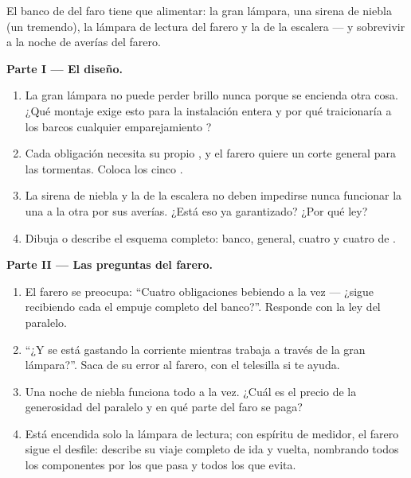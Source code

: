 \begin{problem}\label{pb:g7:circuits-series-parallel:1}
El banco de  del faro tiene que alimentar: la gran lámpara,
una sirena de niebla (un  tremendo), la lámpara de lectura del
farero y la  de la escalera --- y sobrevivir a la noche de
averías del farero.

\medskip\noindent\textbf{Parte I --- El diseño.}
\begin{enumerate}
  \item La gran lámpara no puede perder brillo nunca porque se
        encienda otra cosa. ¿Qué montaje exige esto para la
        instalación entera y por qué traicionaría a los barcos
        cualquier emparejamiento ?
  \item Cada obligación necesita su propio , y el farero
        quiere un corte general para las tormentas. Coloca los cinco
        .
  \item La sirena de niebla y la  de la escalera no deben
        impedirse nunca funcionar la una a la otra por sus averías.
        ¿Está eso ya garantizado? ¿Por qué ley?
  \item Dibuja o describe el esquema completo: banco,
         general, cuatro  y cuatro
         de .
\end{enumerate}

\medskip\noindent\textbf{Parte II --- Las preguntas del farero.}
\begin{enumerate}[resume]
  \item El farero se preocupa: ``Cuatro obligaciones bebiendo a la
        vez --- ¿sigue recibiendo cada  el empuje completo del
        banco?''. Responde con la ley del paralelo.
  \item ``¿Y se está gastando la corriente mientras trabaja a través
        de la gran lámpara?''. Saca de su error al farero, con el
        telesilla si te ayuda.
  \item Una noche de niebla funciona todo a la vez. ¿Cuál es el
        precio de la generosidad del paralelo y en qué parte del faro
        se paga?
  \item Está encendida solo la lámpara de lectura; con espíritu de
        medidor, el farero sigue el desfile: describe su viaje
        completo de ida y vuelta, nombrando todos los componentes por
        los que pasa y todos los que evita.
\end{enumerate}


\end{problem}
